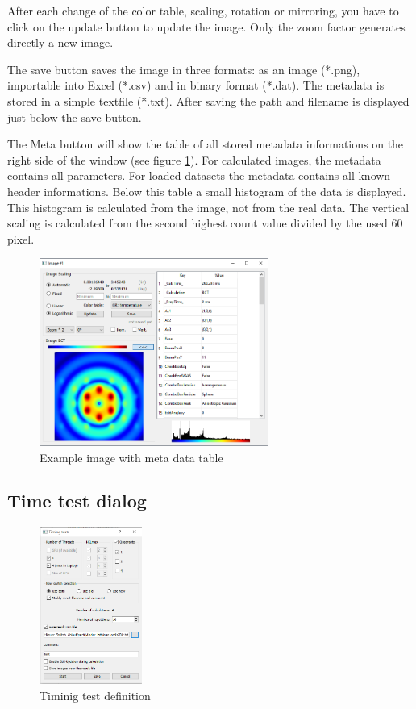\documentclass[11pt]{article} %
\begin{document}
After each change of the color table, scaling, rotation or mirroring, you have to click on the update button to update the image. Only the zoom factor generates directly a new image.

The save button saves the image in three formats: as an image (*.png), importable into Excel (*.csv) and in binary format (*.dat). The metadata is stored in a simple textfile (*.txt). After saving the path and filename is displayed just below the save button.

The Meta button will show the table of all stored metadata informations on the right side of the window (see figure \ref{fig:imagemeta}). For calculated images, the metadata contains all parameters. For loaded datasets the metadata contains all known header informations. Below this table a small histogram of the data is displayed. This histogram is calculated from the image, not from the real data. The vertical scaling is calculated from the second highest count value divided by the used 60 pixel.
\begin{figure}[H]
 \centering
 \includegraphics[width=0.67\textwidth]{img-bct-meta.png}
 \caption{Example image with meta data table}
 \label{fig:imagemeta}
\end{figure}


\subsection{Time test dialog}

\begin{figure}
  \begin{center}
    \includegraphics[width=0.3\textwidth]{timing_test.png}
  \end{center}
 \caption{Timinig test definition}
\end{figure}
\end{document}
